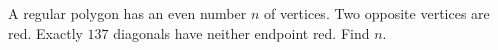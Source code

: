 A regular polygon has an even number $n$ of vertices. Two opposite vertices are red. Exactly $137$ diagonals have neither endpoint red. Find $n$.
